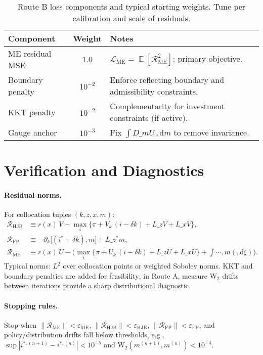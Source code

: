﻿\documentclass[11pt,letterpaper,oneside]{article}
\numberwithin{equation}{section}
\DeclareMathOperator{\E}{\mathbb{E}}
\newcommand{\1}{\mathbf{1}}
\newcommand{\diff}{,\mathrm{d}}
\newcommand{\Lz}{L\_z}
\newcommand{\Lx}{L\_x}
\newcommand{\Lzadj}{L\_z^{\!*}}
\newcommand{\dmU}{D\_m U}
\newcommand{\dxi}{, m(\diff \xi)}
\begin{document}
\begin{table}[ht]
\centering
\small
\begin{tabular}{@{}lcl@{}}
\toprule
Component & Weight & Notes \\
\midrule
ME residual MSE & $1.0$ & $\mathcal{L}_{\mathrm{ME}}=\E[\mathcal{R}_{\mathrm{ME}}^2]$; primary objective. \\
Boundary penalty & $10^{-2}$ & Enforce reflecting boundary and admissibility constraints. \\
KKT penalty & $10^{-2}$ & Complementarity for investment constraints (if active). \\
Gauge anchor & $10^{-3}$ & Fix $\int \dmU\,\diff m$ to remove invariance. \\
\bottomrule
\end{tabular}
\caption{Route B loss components and typical starting weights. Tune per calibration and scale of residuals.}
\end{table}

\section{Verification and Diagnostics}\label{sec:verification}

\paragraph{Residual norms.}
For collocation tuples $(k,z,x,m)$:
\begin{align*}
\mathcal{R}_{\mathrm{HJB}} &\equiv r(x)\, V - \max_{i}\{\pi + V_k\,(i-\delta k) + \Lz V + \Lx V\},\\
\mathcal{R}_{\mathrm{FP}}  &\equiv -\partial_k\big[(i^*-\delta k),m\big] + \Lzadj m,\\
\mathcal{R}_{\mathrm{ME}}  &\equiv r(x)\,U - \Big(\max_{i}\{\pi + U_k\,(i-\delta k) + \Lz U + \Lx U\}
  + \int\cdots\dxi
  \Big).
\end{align*}
  Typical norms: $L^2$ over collocation points or weighted Sobolev norms. KKT and boundary penalties are added for feasibility; in Route A, measure $\mathrm{W}_2$ drifts between iterations provide a sharp distributional diagnostic.

\paragraph{Stopping rules.}
Stop when $\|\mathcal{R}_{\mathrm{ME}}\|<\varepsilon_{\mathrm{ME}}$, $\|\mathcal{R}_{\mathrm{HJB}}\|<\varepsilon_{\mathrm{HJB}}$, $\|\mathcal{R}_{\mathrm{FP}}\|<\varepsilon_{\mathrm{FP}}$, and policy/distribution drifts fall below thresholds, e.g., $\sup|i^{*,(n+1)}-i^{*,(n)}|<10^{-5}$ and $\mathrm{W}_2(m^{(n+1)},m^{(n)})<10^{-4}$.
\end{document}
